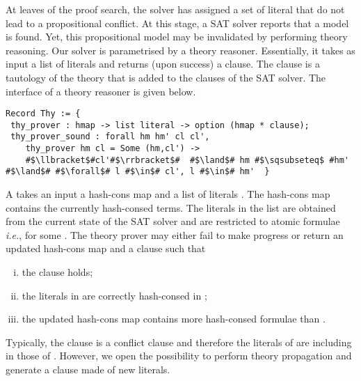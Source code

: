 \documentclass[utf8,a4paper,UKenglish,cleveref, autoref, thm-restate]{lipics-v2019}
\begin{document}
At leaves of the proof search, the solver has assigned a set of
literal that do not lead to a propositional conflict. At this stage, a
SAT solver reports that a model is found.
%
Yet, this propositional model may be invalidated by performing theory reasoning.
%
Our solver is parametrised by a theory reasoner. Essentially, it takes
as input a list of literals and returns (upon success) a clause. The
clause is a tautology of the theory that is added to the clauses of
the SAT solver.
%
The interface of a theory reasoner is given below.
\begin{verbatim}
Record Thy := {
 thy_prover : hmap -> list literal -> option (hmap * clause);
 thy_prover_sound : forall hm hm' cl cl',
    thy_prover hm cl = Some (hm,cl') ->
    #$\llbracket$#cl'#$\rrbracket$#  #$\land$# hm #$\sqsubseteq$ #hm' #$\land$# #$\forall$# l #$\in$# cl', l #$\in$# hm'  }
\end{verbatim}
A  takes an input a hash-cons map  and a
list of literals .  The hash-cons map  contains the
currently hash-consed terms. The literals in the list  are
obtained from the current state of the SAT solver and are restricted
to atomic formulae \emph{i.e.},  for some .
%
The theory prover may either fail to make progress or return an
updated hash-cons map  and a clause  such that
\begin{enumerate}[i)]
\item the clause  holds;
\item the literals in  are correctly hash-consed in ;
\item the updated hash-cons map  contains more hash-consed formulae than .
\end{enumerate}
Typically, the clause  is a conflict clause and therefore
the literals of  are including in those of
. However, we open the possibility to perform theory
propagation and generate a clause made of new literals.
%
\end{document}
